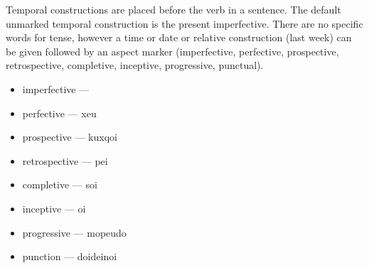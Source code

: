 Temporal constructions are placed before the verb in a sentence. The default unmarked temporal construction is the present imperfective. There are no specific words for tense, however a time or date or relative construction (last week) can be given followed by an aspect marker (imperfective, perfective, prospective, retrospective, completive, inceptive, progressive, punctual).

\begin{itemize}[label={}]
    \item imperfective --- \nullset{}
    \item perfective --- xeu
    \item prospective --- kuxqoi
    \item retrospective --- \dU{}pei
    \item completive --- soi
    \item inceptive --- \tU{}oi
    \item progressive --- mo\sU{}peudo
    \item punction --- doideinoi
\end{itemize}